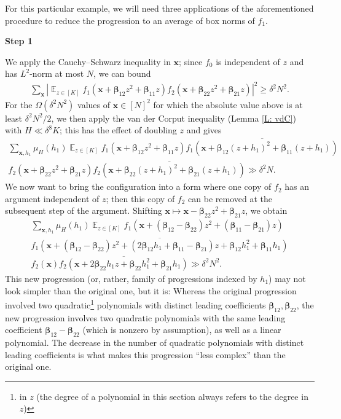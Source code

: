\documentclass[11pt]{amsart}
\theoremstyle{definition}
\DeclareMathOperator*{\E}{\mathbb{E}}
\newcommand{\bx}{{\textbf{x}}}
\newcommand{\bbeta}{{\boldsymbol{\beta}}}
\newcommand{\abs}[1]{\mathopen{}\left| #1\mathclose{}\right|}
\begin{document}
For this particular example, we will need three applications of the aforementioned procedure to reduce the progression to an average of box norms of $f_1$.

\smallskip
\textbf{Step 1}
\smallskip

We apply the Cauchy--Schwarz inequality in $\bx$; since $f_0$ is independent of $z$ and has $L^2$-norm at most $N$, we can bound
\begin{align*}
    \sum_{\bx}\abs{\E_{z\in[K]}f_1(\bx+ \bbeta_{12}z^2 + \bbeta_{11}z)f_2(\bx + \bbeta_{22}z^2 + \bbeta_{21}z)}^2\geq \delta^2 N^2.
\end{align*}
For the $\Omega(\delta^2 N^2)$ values of $\bx\in[N]^2$ for which the absolute value above is at least $\delta^2 N^2/2$, we then apply the van der Corput inequality (Lemma \ref{L: vdC}) with $H\ll \delta^8 K$; this has the effect of doubling $z$ and gives
\begin{multline*}
    \sum_{\bx, h_1}\mu_H(h_1)\E_{z\in[K]}f_1(\bx + \bbeta_{12}z^2 + \bbeta_{11}z)\overline{f_1(\bx + \bbeta_{12}(z+h_1)^2 + \bbeta_{11}(z+h_1))}\\
    f_2(\bx + \bbeta_{22}z^2 + \bbeta_{21}z)\overline{f_2(\bx + \bbeta_{22}(z+h_1)^2 + \bbeta_{21}(z+h_1))}\gg \delta^2 N.
\end{multline*}
We now want to bring the configuration into a form where one copy of $f_2$ has an argument independent of $z$; then this copy of $f_2$ can be removed at the subsequent step of the argument. Shifting $\bx \mapsto \bx - \bbeta_{22}z^2 + \bbeta_{21}z$, we obtain
\begin{multline*}
    \sum_{\bx, h_1}\mu_H(h_1)\E_{z\in[K]}f_1(\bx + (\bbeta_{12}-\bbeta_{22})z^2 + (\bbeta_{11}-\bbeta_{21})z)\\
    \overline{f_1(\bx + (\bbeta_{12}-\bbeta_{22})z^2 + (2\bbeta_{12}h_1+\bbeta_{11}-\bbeta_{21} )z + \bbeta_{12}h_1^2 + \bbeta_{11}h_1)}\\
    f_2(\bx)\overline{f_2(\bx+2\bbeta_{22}h_1z + \bbeta_{22} h_1^2 + \bbeta_{21}h_1)}\gg\delta^2 N^2. 
\end{multline*}
This new progression (or, rather, family of progressions indexed by $h_1$) may not look simpler than the original one, but it is: Whereas the original progression involved two quadratic\footnote{in $z$ (the degree of a polynomial in this section always refers to the degree in $z$)} polynomials with distinct leading coefficients $\bbeta_{12}, \bbeta_{22}$, the new progression  involves two quadratic polynomials with the same leading coefficient $\bbeta_{12}-\bbeta_{22}$ (which is nonzero by assumption), as well as a linear polynomial. The decrease in the number of quadratic polynomials with distinct leading coefficients is what makes this progression ``less complex'' than the original one.
\end{document}
